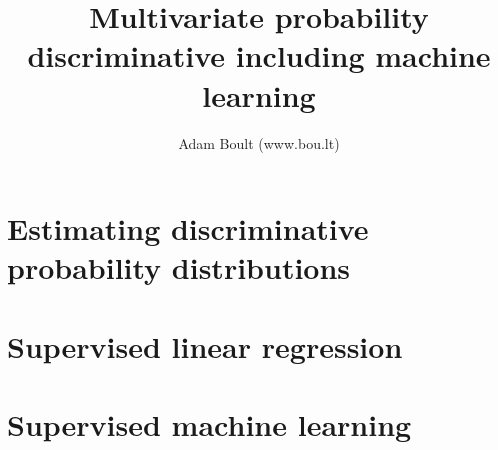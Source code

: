 \documentclass[oneside]{book}
\begin{document}
\author{Adam Boult (www.bou.lt)}
\title{Multivariate probability discriminative including machine learning}
\maketitle

\setcounter{tocdepth}{0}
\tableofcontents



\part{Estimating discriminative probability distributions}






\part{Supervised linear regression}






\part{Supervised machine learning}

















\end{document}
